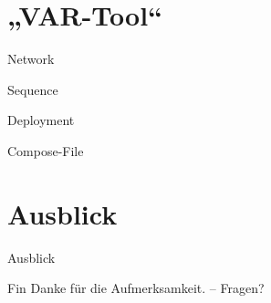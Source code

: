 \documentclass[compress]{beamer}
\begin{document}
\section{„VAR-Tool“}
\begin{frame}{}
\end{frame}
\begin{frame}{}
\end{frame}
\begin{frame}{Network}
\end{frame}
\begin{frame}{Sequence}
\end{frame}
\begin{frame}{Deployment}
\end{frame}
\begin{frame}{Compose-File}
\end{frame}

\section{Ausblick}
\begin{frame}{Ausblick}
\end{frame}

\begin{frame}{Fin}
  Danke für die Aufmerksamkeit. -- Fragen?
\end{frame}
\end{document}
